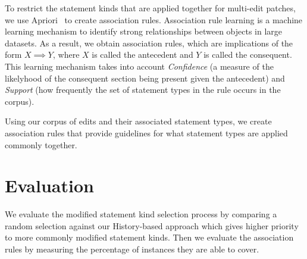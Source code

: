 \documentclass[sigconf]{acmart}
\begin{document}

To restrict the statement kinds that are applied together for 
multi-edit patches, we use Apriori~\cite{Agrawal94} to create
association rules.
Association rule learning is a machine learning mechanism to identify
strong relationships between objects in large datasets. 
As a result, we obtain association rules, which are implications of the
form $X \implies Y$, where $X$ is called the antecedent and 
$Y$ is called the consequent.
This learning mechanism takes into 
account \textit{Confidence} (a measure of the likelyhood 
of the consequent section being present given the 
antecedent) and \textit{Support} (how frequently the set of
statement types in the rule occurs in the corpus).

Using our corpus of edits and their associated statement types, 
we create association rules that provide guidelines
for what statement types are applied commonly together. 

\section{Evaluation}
\label{eval}
We evaluate the modified statement kind selection process
by comparing a random selection against our History-based 
approach which gives higher priority to more commonly 
modified statement kinds. Then we evaluate the association
rules by measuring the percentage of instances they are able to 
cover.
\end{document}
